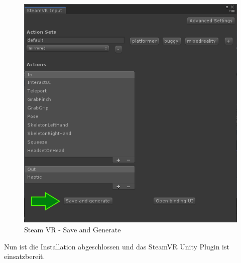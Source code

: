 \begin {figure}
    \centering
    \includegraphics[scale=0.6]{pics/steamVR-Input-SaveAndGenerate}
    \caption{Steam VR - Save and Generate}
    \label{fig:steamvr_save_and_generate}
\end {figure}
Nun ist die Installation abgeschlossen und das SteamVR Unity Plugin ist einsatzbereit.
~\cite{SteamVR_Quickstart_2022}

